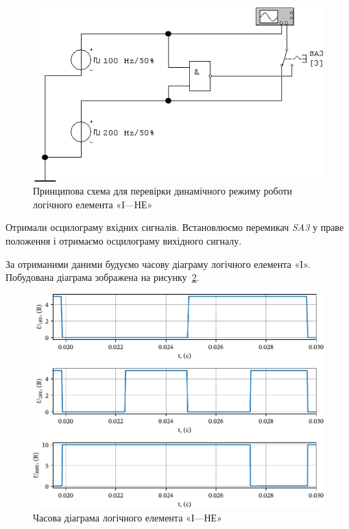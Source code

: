 \documentclass[a4paper,oneside,DIV=10,12pt]{scrartcl}
\newcommand\schel[1]{\textit{#1}}
\begin{document}
			\begin{figure}[!htbp]
			\centering
				\includegraphics[]{schematics/04-02-NAND.png}
			\caption{Принципова схема для перевірки динамічного режиму роботи логічного елемента «І—НЕ»}
			\label{fig:NAND-dynamic-mode-schematic}
			\end{figure}
			
			Отримали осцилограму вхідних сигналів. Встановлюємо перемикач \schel{SA3} у праве положення і отримаємо осцилограму вихідного сигналу.
			
			За отриманими даними будуємо часову діаграму логічного елемента «І». Побудована діаграма зображена на рисунку~\ref{fig:NAND-time-diagram}.
			
			\begin{figure}[!htbp]
			\centering
				\includegraphics[width=\textwidth]{plots/03-pdf/04-NAND-time-diagram-edited.pdf}
			\caption{Часова діаграма логічного елемента «І—НЕ»}
			\label{fig:NAND-time-diagram}
			\end{figure}
			
\end{document}
